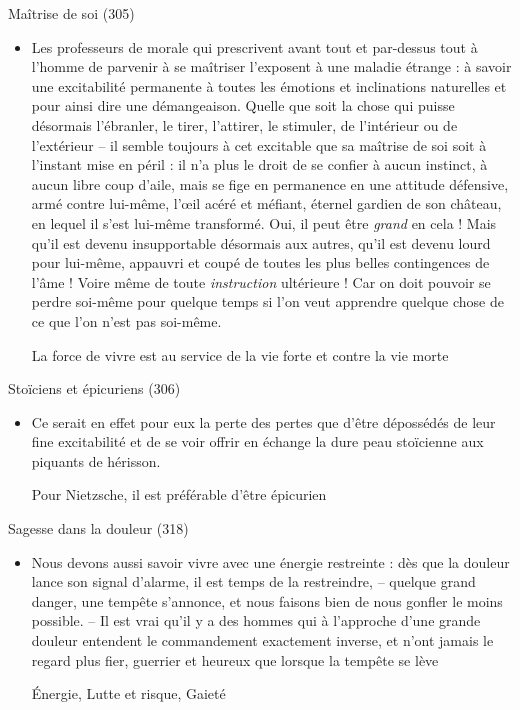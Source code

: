 \documentclass[french,a4paper,11pt,answers]{exam}
\newcommand{\cit}[2]{\og #1 \fg{} \begin{solution}{ #2 }\end{solution}} %
\begin{document}
	\begin{cadre}{Maîtrise de soi (305)}
		\begin{itemize}
			\item \cit{Les professeurs de morale qui prescrivent avant tout et par-dessus tout à l’homme de parvenir à se maîtriser l’exposent à une maladie étrange : à savoir une excitabilité permanente à toutes les émotions et inclinations naturelles et pour ainsi dire une démangeaison. Quelle que soit la chose qui puisse désormais l’ébranler, le tirer, l’attirer, le stimuler, de l’intérieur ou de l’extérieur – il semble toujours à cet excitable que sa maîtrise de soi soit à l’instant mise en péril : il n’a plus le droit de se confier à aucun instinct, à aucun libre coup d’aile, mais se fige en permanence en une attitude défensive, armé contre lui-même, l’œil acéré et méfiant, éternel gardien de son château, en lequel il s’est lui-même transformé. Oui, il peut être \emph{grand} en cela ! Mais qu’il est devenu insupportable désormais aux autres, qu’il est devenu lourd pour lui-même, appauvri et coupé de toutes les plus belles contingences de l’âme ! Voire même de toute \emph{instruction} ultérieure ! Car on doit pouvoir se perdre soi-même pour quelque temps si l’on veut apprendre quelque chose de ce que l’on n’est pas soi-même.}
				{La force de vivre est au service de la vie forte et contre la vie morte} %
		\end{itemize}
	\end{cadre}
	
	\begin{cadre}{Stoïciens et épicuriens (306)}
		\begin{itemize}
			\item \cit{Ce serait en effet pour eux la perte des pertes que d'être dépossédés de leur fine excitabilité et de se voir offrir en échange la dure peau stoïcienne aux piquants de hérisson.}
				{Pour Nietzsche, il est préférable d'être épicurien}
		\end{itemize}
	\end{cadre}
	
	\begin{cadre}{Sagesse dans la douleur (318)}
		\begin{itemize}
			\item \cit{Nous devons aussi savoir vivre avec une énergie restreinte : dès que la douleur lance son signal d'alarme, il est temps de la restreindre, -- quelque grand danger, une tempête s'annonce, et nous faisons bien de nous \og gonfler \fg{} le moins possible. -- Il est vrai qu'il y a des hommes qui à l'approche d'une grande douleur entendent le commandement exactement inverse, et n'ont jamais le regard plus fier, guerrier et heureux que lorsque la tempête se lève}
				{Énergie, Lutte et risque, Gaieté}
		\end{itemize}
	\end{cadre}
\end{document}
